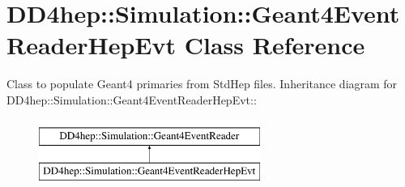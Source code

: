 \hypertarget{class_d_d4hep_1_1_simulation_1_1_geant4_event_reader_hep_evt}{
\section{DD4hep::Simulation::Geant4EventReaderHepEvt Class Reference}
\label{class_d_d4hep_1_1_simulation_1_1_geant4_event_reader_hep_evt}
}


Class to populate Geant4 primaries from StdHep files.  
Inheritance diagram for DD4hep::Simulation::Geant4EventReaderHepEvt::\begin{figure}[H]
\begin{center}
\leavevmode
\includegraphics[height=2cm]{class_d_d4hep_1_1_simulation_1_1_geant4_event_reader_hep_evt}
\end{center}
\end{figure}
